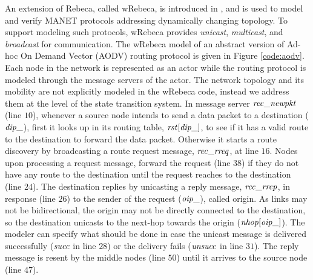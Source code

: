 An extension of Rebeca, called wRebeca, is introduced in \cite{FOAC}, and is used to 
model and verify MANET protocols addressing dynamically changing topology. To support modeling such protocols, wRebeca provides \textit{unicast}, \textit{multicast}, and \textit{broadcast} for communication. The wRebeca model of an abstract version of Ad-hoc On Demand Vector (AODV) routing protocol \cite{AODV} is given in Figure \ref{code:aodv}. Each node in the network is represented as an actor while the routing protocol is modeled through the message servers of the actor. The network topology and its mobility 
are not explicitly modeled in the wRebeca code, instead we address them at the level of the state transition system.  In message server ${\it rec\_newpkt}$ (line $10$),
whenever a source node intends to send a data packet to a destination (${\it dip\_}$), first it looks up in its routing table, ${\it rst}[{\it dip\_}]$, to see if it has a valid route to the destination to forward the data packet. Otherwise it starts a route discovery by broadcasting a route request message, ${\it rec\_rreq}$, at line $16$. Nodes upon processing a request message, forward the request (line $38$) if they do not have any route to the destination until the request reaches to the destination (line $24$). The destination replies by unicasting a reply message, ${\it rec\_rrep}$, in response (line $26$) to the sender of the request (${\it oip\_}$), called origin. As links may not be bidirectional, the origin may not be directly connected to the destination, so the destination unicasts to the next-hop towards the origin (${\it nhop}[{\it oip\_}]$). The modeler can specify what should be done in case the unicast message is delivered
successfully ($\it succ$ in line $28$) %
or the delivery fails ($\it unsucc$ in line $31$). %
The reply message is resent by the middle nodes (line $50$) until it arrives to the source node (line $47$).


\begin{figure*}
	\begin{center}
		
	\end{center}
	\caption{The AODV protocol specified by wRebeca \label{code:aodv}\cite{FOAC}}
\end{figure*} 

